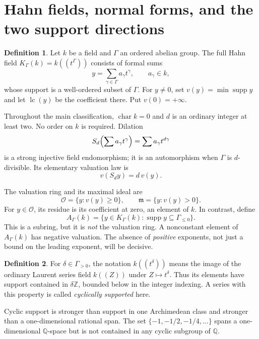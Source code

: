 \documentclass[11pt,letterpaper]{article}
\numberwithin{equation}{section}
\theoremstyle{definition}
\newtheorem{definition}[definition]{Definition}
\theoremstyle{remark}
\newcommand{\Q}{\mathbb Q}
\newcommand{\Z}{\mathbb Z}
\newcommand{\A}{A_\Gamma(k)}
\newcommand{\K}{K_\Gamma(k)}
\newcommand{\supp}{\operatorname{supp}}
\newcommand{\lc}{\operatorname{lc}}
\begin{document}
\section{Hahn fields, normal forms, and the two support directions}
\label{adr:sec:setup}

\begin{definition}
Let $k$ be a field and $\Gamma$ an ordered abelian group. The full Hahn
field $\K=k((t^\Gamma))$ consists of formal sums
\[
 y=\sum_{\gamma\in\Gamma}a_\gamma t^\gamma,
 \qquad a_\gamma\in k,
\]
whose support is a well-ordered subset of $\Gamma$. For $y\ne0$, set
$v(y)=\min\supp y$ and let $\lc(y)$ be the coefficient there. Put
$v(0)=+\infty$.
\end{definition}

Throughout the main classification, $\operatorname{char}k=0$ and $d$ is
an ordinary integer at least two. No order on $k$ is required. Dilation
\begin{equation}\label{adr:eq:Sd}
 S_d\Bigl(\sum a_\gamma t^\gamma\Bigr)=
 \sum a_\gamma t^{d\gamma}
\end{equation}
is a strong injective field endomorphism; it is an automorphism when
$\Gamma$ is $d$-divisible. Its elementary valuation law is
\begin{equation}\label{adr:eq:val-dilation}
 v(S_dy)=d\,v(y).
\end{equation}

The valuation ring and its maximal ideal are
\[
 \mathcal O=\{y:v(y)\ge0\},\qquad
 \mathfrak m=\{y:v(y)>0\}.
\]
For $y\in\mathcal O$, its residue is its coefficient at zero, an element
of $k$. In contrast, define
\begin{equation}\label{adr:eq:A}
 \A=\{y\in\K:\supp y\subseteq\Gamma_{\le0}\}.
\end{equation}
This is a subring, but it is \emph{not} the valuation ring. A nonconstant
element of $\A$ has negative valuation. The absence of \emph{positive}
exponents, not just a bound on the leading exponent, will be decisive.

\begin{definition}
For $\delta\in\Gamma_{>0}$, the notation $k((t^\delta))$ means the image
of the ordinary Laurent series field $k((Z))$ under $Z\mapsto t^\delta$.
Thus its elements have support contained in $\delta\Z$, bounded below
in the integer indexing. A series with this property is called
\emph{cyclically supported} here.
\end{definition}

Cyclic support is stronger than support in one Archimedean class and
stronger than a one-dimensional rational span. The set
$\{-1,-1/2,-1/4,\ldots\}$ spans a one-dimensional $\Q$-space but is not
contained in any cyclic subgroup of $\Q$.
\end{document}
